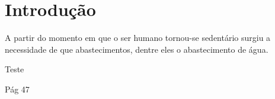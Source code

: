 \documentclass[
	12pt,				%
	openright,			%
	twoside,			%
	a4paper,			%
	english,			%
	french,				%
	spanish,			%
	brazil				%
	]{abntex2}
\begin{document}
\textual

\chapter*[Introdução]{Introdução}


A partir do momento em que o ser humano tornou-se sedentário surgiu a necessidade de que abastecimentos, dentre eles o abastecimento de água.

Teste \cite{cormen2012}

\cite{rocha2009}






Pág 47






\end{document}
